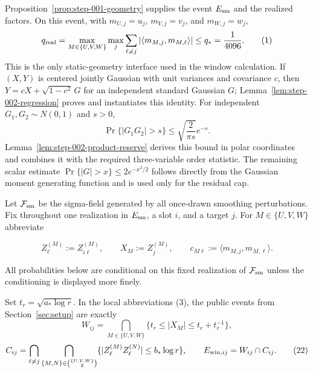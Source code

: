 Proposition~\ref{prop:step-001-geometry} supplies the event $E_{\rm sm}$ and
the realized factors. On this event, with
$m_{U,j}=u_j$, $m_{V,j}=v_j$, and $m_{W,j}=w_j$,
\[
q_{\rm real}
=\max_{M\in\{U,V,W\}}\max_j
 \sum_{\ell\ne j}|\langle m_{M,j},m_{M,\ell}\rangle|
\le q_*=\frac1{4096}.
\tag{1}
\]
This is the only static-geometry interface used in the window calculation.
If $(X,Y)$ is centered jointly Gaussian with unit variances and covariance
$c$, then $Y=cX+\sqrt{1-c^2}\,G$ for an independent standard Gaussian $G$;
Lemma~\ref{lem:step-002-regression} proves and instantiates this identity.
For independent $G_1,G_2\sim N(0,1)$ and $s>0$,
\[
\Pr\{|G_1G_2|>s\}\le \sqrt{\frac{2}{\pi s}}e^{-s}.
\tag{2}
\]
Lemma~\ref{lem:step-002-product-reserve} derives this bound in polar
coordinates and combines it with the required three-variable order statistic.
The remaining scalar estimate
$\Pr\{|G|>x\}\le2e^{-x^2/2}$ follows directly from the Gaussian moment
generating function and is used only for the residual cap.

Let $\mathcal F_{\rm sm}$ be the sigma-field generated by all once-drawn
smoothing perturbations. Fix throughout one realization in $E_{\rm sm}$, a
slot $i$, and a target $j$. For $M\in\{U,V,W\}$ abbreviate

\[
Z_{\ell}^{(M)}:=Z_{i\ell}^{(M)},\qquad
X_M:=Z_j^{(M)},\qquad
c_{M\ell}:=\langle m_{M,j},m_{M,\ell}\rangle .
\tag{3}
\]

All probabilities below are conditional on this fixed realization of
$\mathcal F_{\rm sm}$ unless the conditioning is displayed more finely.

Set $t_r=\sqrt{a_*\log r}$. In the local abbreviations (3), the public
events from Section~\ref{sec:setup} are exactly
\[
W_{ij}=\bigcap_{M\in\{U,V,W\}}
\{t_r\le|X_M|\le t_r+t_r^{-1}\},
\tag{21}
\]
\[
C_{ij}=\bigcap_{\ell\ne j}
\bigcap_{\{M,N\}\in\binom{\{U,V,W\}}2}
\{|Z_{\ell}^{(M)}Z_{\ell}^{(N)}|\le b_*\log r\},
\qquad E_{{\rm win},ij}=W_{ij}\cap C_{ij}.
\tag{22}
\]

